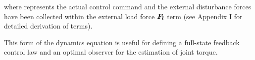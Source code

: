 \DIFaddbegin 

\DIFaddend \setlength{\arraycolsep}{5pt}

where  \DIFdelbegin {}\DIFdelend \DIFaddbegin {}\DIFaddend represents the actual control command and the external  disturbance forces  have been collected within the external load  force  ${ \boldsymbol {F_l}}$  term (see Appendix I for detailed derivation of terms).

This form of the dynamics equation is useful for defining a full-state feedback control law and an optimal observer for the estimation of joint torque.






